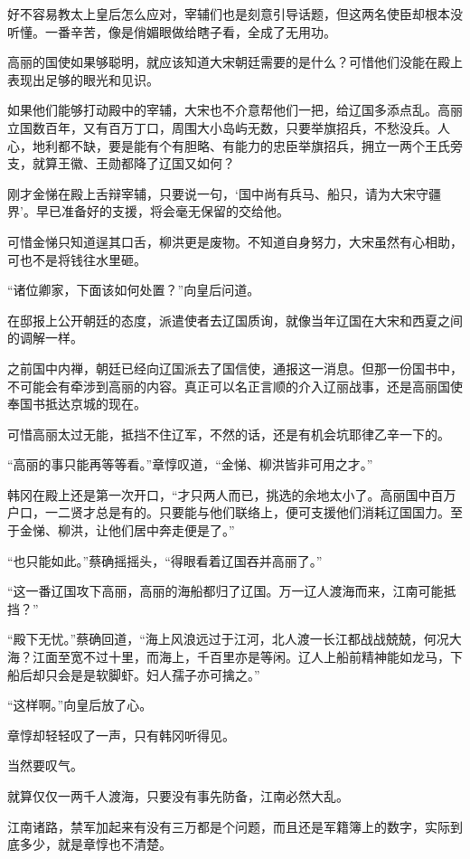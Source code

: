 好不容易教太上皇后怎么应对，宰辅们也是刻意引导话题，但这两名使臣却根本没听懂。一番辛苦，像是俏媚眼做给瞎子看，全成了无用功。

高丽的国使如果够聪明，就应该知道大宋朝廷需要的是什么？可惜他们没能在殿上表现出足够的眼光和见识。

如果他们能够打动殿中的宰辅，大宋也不介意帮他们一把，给辽国多添点乱。高丽立国数百年，又有百万丁口，周围大小岛屿无数，只要举旗招兵，不愁没兵。人心，地利都不缺，要是能有个有胆略、有能力的忠臣举旗招兵，拥立一两个王氏旁支，就算王徽、王勋都降了辽国又如何？

刚才金悌在殿上舌辩宰辅，只要说一句，‘国中尚有兵马、船只，请为大宋守疆界’。早已准备好的支援，将会毫无保留的交给他。

可惜金悌只知道逞其口舌，柳洪更是废物。不知道自身努力，大宋虽然有心相助，可也不是将钱往水里砸。

“诸位卿家，下面该如何处置？”向皇后问道。

在邸报上公开朝廷的态度，派遣使者去辽国质询，就像当年辽国在大宋和西夏之间的调解一样。

之前国中内禅，朝廷已经向辽国派去了国信使，通报这一消息。但那一份国书中，不可能会有牵涉到高丽的内容。真正可以名正言顺的介入辽丽战事，还是高丽国使奉国书抵达京城的现在。

可惜高丽太过无能，抵挡不住辽军，不然的话，还是有机会坑耶律乙辛一下的。

“高丽的事只能再等等看。”章惇叹道，“金悌、柳洪皆非可用之才。”

韩冈在殿上还是第一次开口，“才只两人而已，挑选的余地太小了。高丽国中百万户口，一二贤才总是有的。只要能与他们联络上，便可支援他们消耗辽国国力。至于金悌、柳洪，让他们居中奔走便是了。”

“也只能如此。”蔡确摇摇头，“得眼看着辽国吞并高丽了。”

“这一番辽国攻下高丽，高丽的海船都归了辽国。万一辽人渡海而来，江南可能抵挡？”

“殿下无忧。”蔡确回道，“海上风浪远过于江河，北人渡一长江都战战兢兢，何况大海？江面至宽不过十里，而海上，千百里亦是等闲。辽人上船前精神能如龙马，下船后却只会是是软脚虾。妇人孺子亦可擒之。”

“这样啊。”向皇后放了心。

章惇却轻轻叹了一声，只有韩冈听得见。

当然要叹气。

就算仅仅一两千人渡海，只要没有事先防备，江南必然大乱。

江南诸路，禁军加起来有没有三万都是个问题，而且还是军籍簿上的数字，实际到底多少，就是章惇也不清楚。

